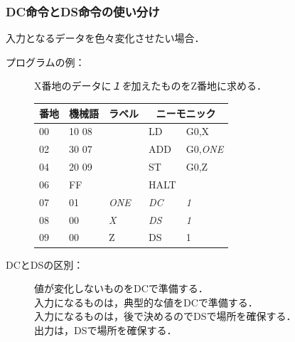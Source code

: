 \documentclass[handout]{beamer}        %
\begin{document}
\begin{frame}
  \frametitle{DC命令とDS命令の使い分け}
  入力となるデータを色々変化させたい場合．
  \begin{description}
  \item[プログラムの例：]
    X番地のデータに\emph{１を}加えたものをZ番地に求める．\\
    {\ttfamily\small\begin{center}
      \begin{tabular}{|l|l|l|l l|} \hline
        番地 & 機械語 & ラベル & \multicolumn{2}{|c|}{ニーモニック} \\
        \hline
        00 & 10 08 &            & LD        & G0,X          \\
        02 & 30 07 &            & ADD       & G0,\emph{ONE} \\
        04 & 20 09 &            & ST        & G0,Z          \\
        06 & FF    &            & HALT      &               \\
        07 & 01    & \emph{ONE} & \emph{DC} & \emph{1}      \\
        08 & 00    & \emph{X}   & \emph{DS} & \emph{1}      \\
        09 & 00    & Z          & DS        & 1             \\
        \hline
      \end{tabular}
    \end{center}}
    \vfill

    \item[DCとDSの区別：]値が変化しないものをDCで準備する．\\
      入力になるものは，典型的な値をDCで準備する．\\
      入力になるものは，後で決めるのでDSで場所を確保する．\\
      出力は，DSで場所を確保する．
  \end{description}
\end{frame}
\end{document}
